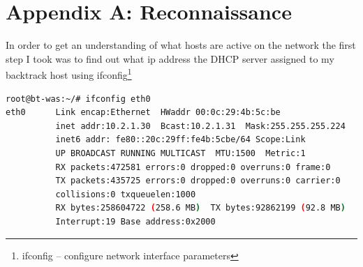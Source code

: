 \documentclass{article}
\begin{document}

\newpage
\section{Appendix A: Reconnaissance}

In order to get an understanding of what hosts are active on the network the first step 
I took was to find out what ip address the DHCP server assigned to my backtrack host using 
ifconfig\footnote{\label{ifconfig}ifconfig -- configure network interface parameters} 

\begin{lstlisting}[language=Bash, firstline=1, lastline=3]
root@bt-was:~/# ifconfig eth0
eth0      Link encap:Ethernet  HWaddr 00:0c:29:4b:5c:be  
          inet addr:10.2.1.30  Bcast:10.2.1.31  Mask:255.255.255.224
          inet6 addr: fe80::20c:29ff:fe4b:5cbe/64 Scope:Link
          UP BROADCAST RUNNING MULTICAST  MTU:1500  Metric:1
          RX packets:472581 errors:0 dropped:0 overruns:0 frame:0
          TX packets:435725 errors:0 dropped:0 overruns:0 carrier:0
          collisions:0 txqueuelen:1000 
          RX bytes:258604722 (258.6 MB)  TX bytes:92862199 (92.8 MB)
          Interrupt:19 Base address:0x2000 
\end{lstlisting}
\end{document}
